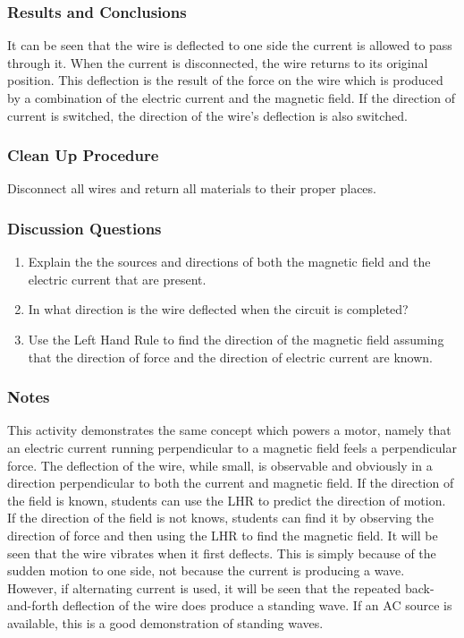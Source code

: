 \subsubsection*{Results and Conclusions}
It can be seen that the wire is deflected to one side the current is allowed to pass through it. When the current is disconnected, the wire returns to its original position. This deflection is the result of the force on the wire which is produced by a combination of the electric current and the magnetic field.  
If the direction of current is switched, the direction of the wire's deflection is also switched.  

\subsubsection*{Clean Up Procedure}
Disconnect all wires and return all materials to their proper places.

\subsubsection*{Discussion Questions}
\begin{enumerate}
\item{Explain the the sources and directions of both the magnetic field and the electric current that are present.} 
\item{In what direction is the wire deflected when the circuit is completed?}
\item{Use the Left Hand Rule to find the direction of the magnetic field assuming that the direction of force and the direction of electric current are known.} 
\end{enumerate}

\subsubsection*{Notes}
This activity demonstrates the same concept which powers a motor, namely that an electric current running perpendicular to a magnetic field feels a perpendicular force. The deflection of the wire, while small, is observable and obviously in a direction perpendicular to both the current and magnetic field.  
If the direction of the field is known, students can use the LHR to predict the direction of motion. If the direction of the field is not knows, students can find it by observing the direction of force and then using the LHR to find the magnetic field.  
It will be seen that the wire vibrates when it first deflects. This is simply because of the sudden motion to one side, not because the current is producing a wave. However, if alternating current is used, it will be seen that the repeated back-and-forth deflection of the wire does produce a standing wave. If an AC source is available, this is a good demonstration of standing waves.  

